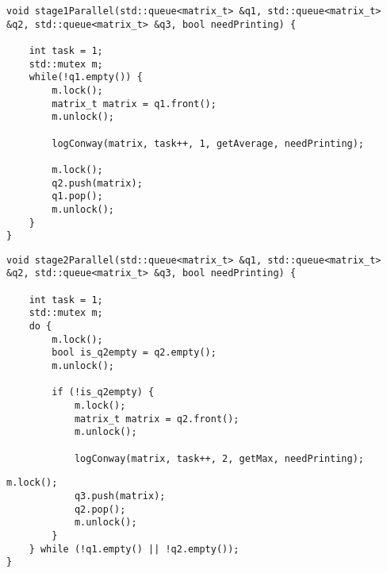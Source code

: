 \begin{center}
\captionsetup{justification=raggedright,singlelinecheck=off}
\begin{lstlisting}[label=lst:stage1,caption=Алгоритм запуска 1 потока для нахождения среднего арифметического элементов матрицы]
void stage1Parallel(std::queue<matrix_t> &q1, std::queue<matrix_t> &q2, std::queue<matrix_t> &q3, bool needPrinting) {
	
	int task = 1;
	std::mutex m;
	while(!q1.empty()) {
		m.lock();
		matrix_t matrix = q1.front();
		m.unlock();
		
		logConway(matrix, task++, 1, getAverage, needPrinting);
		
		m.lock();
		q2.push(matrix);
		q1.pop();
		m.unlock();
	}
}
\end{lstlisting}
\end{center}

\begin{center}
	\captionsetup{justification=raggedright,singlelinecheck=off}
	\begin{lstlisting}[label=lst:stage2,caption=Алгоритм запуска 2 потока для нахождения максимального элемента матрицы (часть 1)]
void stage2Parallel(std::queue<matrix_t> &q1, std::queue<matrix_t> &q2, std::queue<matrix_t> &q3, bool needPrinting) {
	
	int task = 1;
	std::mutex m;
	do {
		m.lock();
		bool is_q2empty = q2.empty();
		m.unlock();
		
		if (!is_q2empty) {
			m.lock();
			matrix_t matrix = q2.front();
			m.unlock();
			
			logConway(matrix, task++, 2, getMax, needPrinting);
	\end{lstlisting}
\end{center}

\begin{center}
	\captionsetup{justification=raggedright,singlelinecheck=off}
	\begin{lstlisting}[label=lst:stage2,caption=Алгоритм запуска 2 потока для нахождения максимального элемента матрицы (часть 2)]
			m.lock();
			q3.push(matrix);
			q2.pop();
			m.unlock();
		}
	} while (!q1.empty() || !q2.empty());
}
	\end{lstlisting}
\end{center}

